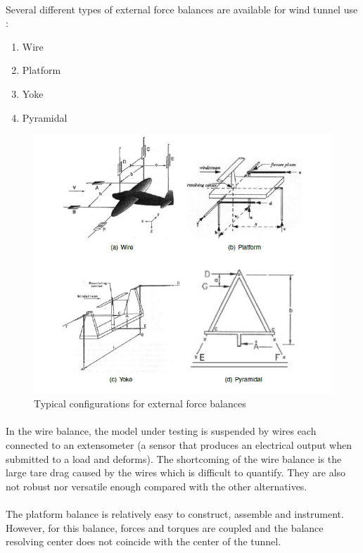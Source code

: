 \paragraph{}Several different types of external force balances are available for wind tunnel use
\cite{morris_force_2010}:
\begin{enumerate}
\item Wire
\item Platform
\item Yoke
\item Pyramidal
\end{enumerate}
\begin{center}
	\begin{figure}[!h]
	\centering
	\includegraphics{Figures/Fig6}
	\caption{Typical configurations for external force balances}
	\end{figure}
\end{center}
\paragraph{}In the wire balance, the model under testing is suspended by wires each connected to an extensometer (a sensor that produces an electrical output when submitted to a load and deforms). The shortcoming of the wire balance is the large tare drag caused by the wires which is difficult to quantify. They are also not robust nor versatile enough compared with the other alternatives. 
\paragraph{}The platform balance is relatively easy to construct, assemble and instrument. However, for this balance, forces and torques are coupled and the balance resolving center does not coincide with the center of the tunnel. 
